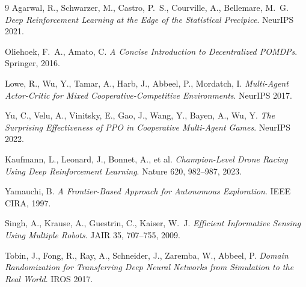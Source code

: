 \documentclass[12pt,a4paper]{article}
\begin{document}
\begin{thebibliography}{9}
Agarwal, R., Schwarzer, M., Castro, P.~S., Courville, A., Bellemare, M.~G.
\emph{Deep Reinforcement Learning at the Edge of the Statistical Precipice}.
NeurIPS 2021.

Oliehoek, F.~A., Amato, C.
\emph{A Concise Introduction to Decentralized POMDPs}.
Springer, 2016.

Lowe, R., Wu, Y., Tamar, A., Harb, J., Abbeel, P., Mordatch, I.
\emph{Multi-Agent Actor-Critic for Mixed Cooperative-Competitive Environments}.
NeurIPS 2017.

Yu, C., Velu, A., Vinitsky, E., Gao, J., Wang, Y., Bayen, A., Wu, Y.
\emph{The Surprising Effectiveness of PPO in Cooperative Multi-Agent Games}.
NeurIPS 2022.

Kaufmann, L., Leonard, J., Bonnet, A., et al.
\emph{Champion-Level Drone Racing Using Deep Reinforcement Learning}.
Nature 620, 982--987, 2023.

Yamauchi, B.
\emph{A Frontier-Based Approach for Autonomous Exploration}.
IEEE CIRA, 1997.

Singh, A., Krause, A., Guestrin, C., Kaiser, W.~J.
\emph{Efficient Informative Sensing Using Multiple Robots}.
JAIR 35, 707--755, 2009.

Tobin, J., Fong, R., Ray, A., Schneider, J., Zaremba, W., Abbeel, P.
\emph{Domain Randomization for Transferring Deep Neural Networks from
Simulation to the Real World}. IROS 2017.
\end{thebibliography}
\end{document}
